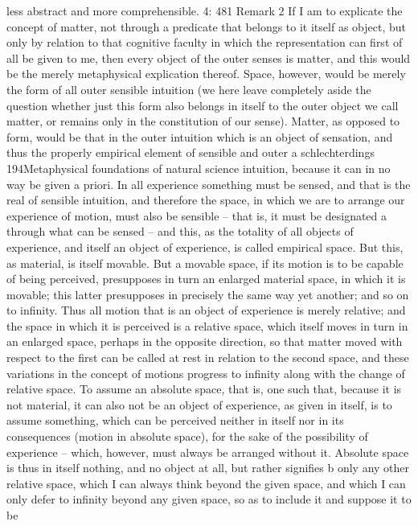 less abstract and more comprehensible.
4: 481
Remark 2
If I am to explicate the concept of matter, not through a predicate that
belongs to it itself as object, but only by relation to that cognitive faculty
in which the representation can ﬁrst of all be given to me, then every object
of the outer senses is matter, and this would be the merely metaphysical
explication thereof. Space, however, would be merely the form of all
outer sensible intuition (we here leave completely aside the question
whether just this form also belongs in itself to the outer object we call
matter, or remains only in the constitution of our sense). Matter, as
opposed to form, would be that in the outer intuition which is an object of
sensation, and thus the properly empirical element of sensible and outer
a
schlechterdings
194Metaphysical foundations of natural science
intuition, because it can in no way be given a priori. In all experience
something must be sensed, and that is the real of sensible intuition, and
therefore the space, in which we are to arrange our experience of motion,
must also be sensible – that is, it must be designated a through what can
be sensed – and this, as the totality of all objects of experience, and itself
an object of experience, is called empirical space. But this, as material, is
itself movable. But a movable space, if its motion is to be capable of being
perceived, presupposes in turn an enlarged material space, in which it is
movable; this latter presupposes in precisely the same way yet another;
and so on to inﬁnity.
Thus all motion that is an object of experience is merely relative; and
the space in which it is perceived is a relative space, which itself moves
in turn in an enlarged space, perhaps in the opposite direction, so that
matter moved with respect to the ﬁrst can be called at rest in relation to
the second space, and these variations in the concept of motions progress
to inﬁnity along with the change of relative space. To assume an absolute
space, that is, one such that, because it is not material, it can also not be an
object of experience, as given in itself, is to assume something, which can
be perceived neither in itself nor in its consequences (motion in absolute
space), for the sake of the possibility of experience – which, however, must
always be arranged without it. Absolute space is thus in itself nothing, and
no object at all, but rather signiﬁes b only any other relative space, which
I can always think beyond the given space, and which I can only defer to
inﬁnity beyond any given space, so as to include it and suppose it to be
